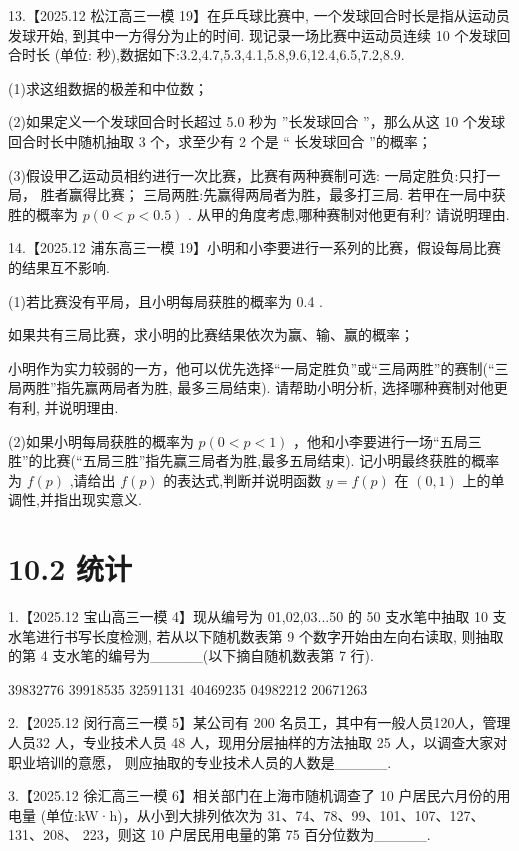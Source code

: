 \documentclass[10pt]{article}
\newcommand*\circled[1]{\tikz[baseline=(char.base)]{\node[shape=circle,draw,inner sep=1.5pt] (char) {\small #1};}}
\begin{document}
13.【2025.12 松江高三一模 19】在乒乓球比赛中, 一个发球回合时长是指从运动员发球开始, 到其中一方得分为止的时间. 现记录一场比赛中运动员连续 10 个发球回合时长 (单位: 秒),数据如下:3.2,4.7,5.3,4.1,5.8,9.6,12.4,6.5,7.2,8.9.

(1)求这组数据的极差和中位数；

(2)如果定义一个发球回合时长超过 5.0 秒为 ”长发球回合 ”，那么从这 10 个发球回合时长中随机抽取 3 个，求至少有 2 个是 “ 长发球回合 ”的概率；

(3)假设甲乙运动员相约进行一次比赛，比赛有两种赛制可选: \circled{1} 一局定胜负:只打一局， 胜者赢得比赛； \circled{2} 三局两胜:先赢得两局者为胜，最多打三局. 若甲在一局中获胜的概率为 \(p\left( {0 < p < {0.5}}\right)\) . 从甲的角度考虑,哪种赛制对他更有利? 请说明理由.

14.【2025.12 浦东高三一模 19】小明和小李要进行一系列的比赛，假设每局比赛的结果互不影响.

(1)若比赛没有平局，且小明每局获胜的概率为 0.4 .

 \circled{1} 如果共有三局比赛，求小明的比赛结果依次为赢、输、赢的概率；

 \circled{2} 小明作为实力较弱的一方，他可以优先选择“一局定胜负”或“三局两胜”的赛制(“三局两胜”指先赢两局者为胜, 最多三局结束). 请帮助小明分析, 选择哪种赛制对他更有利, 并说明理由.

(2)如果小明每局获胜的概率为 \(p\left( {0 < p < 1}\right)\) ，他和小李要进行一场“五局三胜”的比赛(“五局三胜”指先赢三局者为胜,最多五局结束). 记小明最终获胜的概率为 \(f\left( p\right)\) ,请给出 \(f\left( p\right)\) 的表达式,判断并说明函数 \(y = f\left( p\right)\) 在 \(\left( {0,1}\right)\) 上的单调性,并指出现实意义.

\section*{10.2 统计}

1.【2025.12 宝山高三一模 4】现从编号为 01,02,03...50 的 50 支水笔中抽取 10 支水笔进行书写长度检测, 若从以下随机数表第 9 个数字开始由左向右读取, 则抽取的第 4 支水笔的编号为\_\_\_\_\_(以下摘自随机数表第 7 行).

39832776 39918535 32591131 40469235 04982212 20671263

2.【2025.12 闵行高三一模 5】某公司有 200 名员工，其中有一般人员120人，管理人员32 人，专业技术人员 48 人，现用分层抽样的方法抽取 25 人，以调查大家对职业培训的意愿， 则应抽取的专业技术人员的人数是\_\_\_\_\_.

3.【2025.12 徐汇高三一模 6】相关部门在上海市随机调查了 10 户居民六月份的用电量 (单位:kW·h)，从小到大排列依次为 31、74、78、99、101、107、127、131、208、 223，则这 10 户居民用电量的第 75 百分位数为\_\_\_\_\_.
\end{document}
